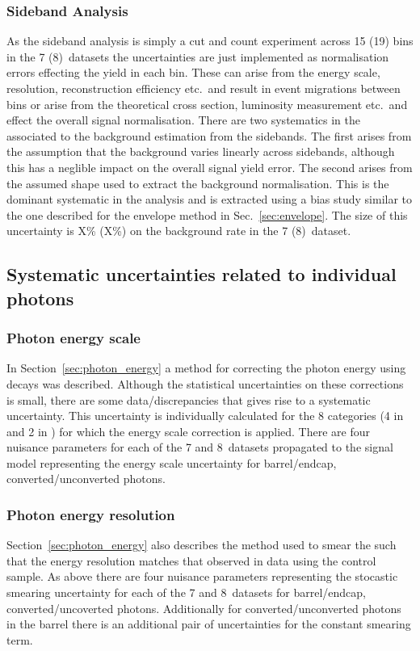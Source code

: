 \subsubsection{Sideband Analysis}

As the sideband analysis is simply a cut and count experiment across 15 (19) bins in the 7 (8)~\TeV datasets the uncertainties are just implemented as normalisation errors effecting the yield in each bin. These can arise from the energy scale, resolution, reconstruction efficiency etc.~and result in event migrations between bins or arise from the theoretical cross section, luminosity measurement etc.~and effect the overall signal normalisation. There are two systematics in the \SMVA associated to the background estimation from the sidebands. The first arises from the assumption that the background varies linearly across sidebands, although this has a neglible impact on the overall signal yield error. The second arises from the assumed shape used to extract the background normalisation. This is the dominant systematic in the analysis and is extracted using a bias study similar to the one described for the envelope method in Sec.~\ref{sec:envelope}. The size of this uncertainty is X\% (X\%) on the background rate in the 7 (8)~\TeV dataset.

\subsection{Systematic uncertainties related to individual photons}

\subsubsection{Photon energy scale}
In Section~\ref{sec:photon_energy} a method for correcting the photon energy using \Zee decays was described. Although the statistical uncertainties on these corrections is small, there are some data/\MC discrepancies that gives rise to a systematic uncertainty. This uncertainty is individually calculated for the 8 categories (4 in \eta and 2 in \rnine) for which the energy scale correction is applied. There are four nuisance parameters for each of the 7 and 8~\TeV datasets propagated to the signal model representing the energy scale uncertainty for barrel/endcap, converted/unconverted photons.

\subsubsection{Photon energy resolution}
Section~\ref{sec:photon_energy} also describes the method used to smear the \MC such that the energy resolution matches that observed in data using the \Zee control sample. As above there are four nuisance parameters representing the stocastic smearing uncertainty for each of the 7 and 8~\TeV datasets for barrel/endcap, converted/uncoverted photons. Additionally for converted/unconverted photons in the barrel there is an additional pair of uncertainties for the constant smearing term.

